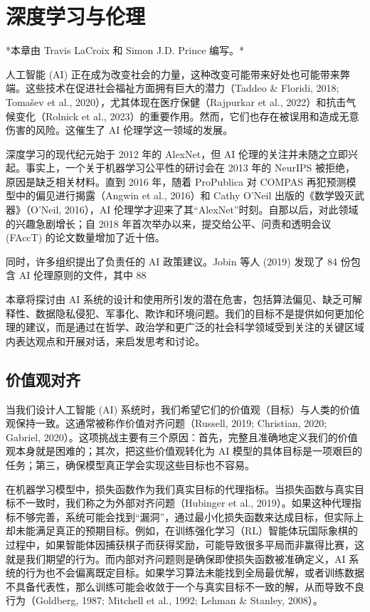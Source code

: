 \chapter{深度学习与伦理}

*本章由 Travis LaCroix 和 Simon J.D. Prince 编写。*

人工智能 (AI) 正在成为改变社会的力量，这种改变可能带来好处也可能带来弊端。这些技术在促进社会福祉方面拥有巨大的潜力（Taddeo \& Floridi, 2018; Tomašev et al., 2020），尤其体现在医疗保健（Rajpurkar et al., 2022）和抗击气候变化（Rolnick et al., 2023）的重要作用。然而，它们也存在被误用和造成无意伤害的风险。这催生了 AI 伦理学这一领域的发展。

深度学习的现代纪元始于 2012 年的 AlexNet，但 AI 伦理的关注并未随之立即兴起。事实上，一个关于机器学习公平性的研讨会在 2013 年的 NeurIPS 被拒绝，原因是缺乏相关材料。直到 2016 年，随着 ProPublica 对 COMPAS 再犯预测模型中的偏见进行揭露（Angwin et al., 2016）和 Cathy O’Neil 出版的《数学毁灭武器》（O’Neil, 2016），AI 伦理学才迎来了其“AlexNet”时刻。自那以后，对此领域的兴趣急剧增长；自 2018 年首次举办以来，提交给公平、问责和透明会议 (FAccT) 的论文数量增加了近十倍。

同时，许多组织提出了负责任的 AI 政策建议。Jobin 等人 (2019) 发现了 84 份包含 AI 伦理原则的文件，其中 88%

本章将探讨由 AI 系统的设计和使用所引发的潜在危害，包括算法偏见、缺乏可解释性、数据隐私侵犯、军事化、欺诈和环境问题。我们的目标不是提供如何更加伦理的建议，而是通过在哲学、政治学和更广泛的社会科学领域受到关注的关键区域内表达观点和开展对话，来启发思考和讨论。

\section{价值观对齐}
当我们设计人工智能 (AI) 系统时，我们希望它们的价值观（目标）与人类的价值观保持一致。这通常被称作价值对齐问题（Russell, 2019; Christian, 2020; Gabriel, 2020）。这项挑战主要有三个原因：首先，完整且准确地定义我们的价值观本身就是困难的；其次，把这些价值观转化为 AI 模型的具体目标是一项艰巨的任务；第三，确保模型真正学会实现这些目标也不容易。

在机器学习模型中，损失函数作为我们真实目标的代理指标。当损失函数与真实目标不一致时，我们称之为外部对齐问题（Hubinger et al., 2019）。如果这种代理指标不够完善，系统可能会找到“漏洞”，通过最小化损失函数来达成目标，但实际上却未能满足真正的预期目标。例如，在训练强化学习（RL）智能体玩国际象棋的过程中，如果智能体因捕获棋子而获得奖励，可能导致很多平局而非赢得比赛，这就是我们期望的行为。而内部对齐问题则是确保即使损失函数被准确定义，AI 系统的行为也不会偏离既定目标。如果学习算法未能找到全局最优解，或者训练数据不具备代表性，那么训练可能会收敛于一个与真实目标不一致的解，从而导致不良行为（Goldberg, 1987; Mitchell et al., 1992; Lehman \& Stanley, 2008）。

